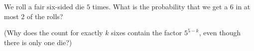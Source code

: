 We roll a fair six-sided die $5$ times. What is the probability that we get a $6$ in at most $2$ of the rolls?

(Why does the count for exactly $k$ sixes contain the factor $5^{5-k}$, even though there is only one die?)

